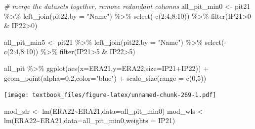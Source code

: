 \documentclass[
  11pt,
]{book}
\newenvironment{Shaded}{\begin{snugshade}}{\end{snugshade}}
\newcommand{\AttributeTok}[1]{\textcolor[rgb]{0.77,0.63,0.00}{#1}}
\newcommand{\CommentTok}[1]{\textcolor[rgb]{0.56,0.35,0.01}{\textit{#1}}}
\newcommand{\DecValTok}[1]{\textcolor[rgb]{0.00,0.00,0.81}{#1}}
\newcommand{\FloatTok}[1]{\textcolor[rgb]{0.00,0.00,0.81}{#1}}
\newcommand{\FunctionTok}[1]{\textcolor[rgb]{0.00,0.00,0.00}{#1}}
\newcommand{\NormalTok}[1]{#1}
\newcommand{\OtherTok}[1]{\textcolor[rgb]{0.56,0.35,0.01}{#1}}
\newcommand{\SpecialCharTok}[1]{\textcolor[rgb]{0.00,0.00,0.00}{#1}}
\newcommand{\StringTok}[1]{\textcolor[rgb]{0.31,0.60,0.02}{#1}}
\theoremstyle{definition}
\theoremstyle{definition}
\theoremstyle{definition}
\theoremstyle{definition}
\theoremstyle{remark}
\begin{document}
\begin{Shaded}
\begin{Highlighting}[]
\CommentTok{\# merge the datasets together, remove redundant columns}
\NormalTok{all\_pit\_min0 }\OtherTok{\textless{}{-}}\NormalTok{ pit21 }\SpecialCharTok{\%\textgreater{}\%} \FunctionTok{left\_join}\NormalTok{(pit22,}\AttributeTok{by =} \StringTok{"Name"}\NormalTok{) }\SpecialCharTok{\%\textgreater{}\%} 
  \FunctionTok{select}\NormalTok{(}\SpecialCharTok{{-}}\FunctionTok{c}\NormalTok{(}\DecValTok{2}\SpecialCharTok{:}\DecValTok{4}\NormalTok{,}\DecValTok{8}\SpecialCharTok{:}\DecValTok{10}\NormalTok{)) }\SpecialCharTok{\%\textgreater{}\%} \FunctionTok{filter}\NormalTok{(IP21}\SpecialCharTok{\textgreater{}}\DecValTok{0} \SpecialCharTok{\&}\NormalTok{ IP22}\SpecialCharTok{\textgreater{}}\DecValTok{0}\NormalTok{)}

\NormalTok{all\_pit\_min5 }\OtherTok{\textless{}{-}}\NormalTok{ pit21 }\SpecialCharTok{\%\textgreater{}\%}  \FunctionTok{left\_join}\NormalTok{(pit22,}\AttributeTok{by =} \StringTok{"Name"}\NormalTok{) }\SpecialCharTok{\%\textgreater{}\%} 
  \FunctionTok{select}\NormalTok{(}\SpecialCharTok{{-}}\FunctionTok{c}\NormalTok{(}\DecValTok{2}\SpecialCharTok{:}\DecValTok{4}\NormalTok{,}\DecValTok{8}\SpecialCharTok{:}\DecValTok{10}\NormalTok{)) }\SpecialCharTok{\%\textgreater{}\%} \FunctionTok{filter}\NormalTok{(IP21}\SpecialCharTok{\textgreater{}}\DecValTok{5} \SpecialCharTok{\&}\NormalTok{ IP22}\SpecialCharTok{\textgreater{}}\DecValTok{5}\NormalTok{)}
\end{Highlighting}
\end{Shaded}

\begin{Shaded}
\begin{Highlighting}[]
\NormalTok{all\_pit }\SpecialCharTok{\%\textgreater{}\%} \FunctionTok{ggplot}\NormalTok{(}\FunctionTok{aes}\NormalTok{(}\AttributeTok{x=}\NormalTok{ERA21,}\AttributeTok{y=}\NormalTok{ERA22,}\AttributeTok{size=}\NormalTok{IP21}\SpecialCharTok{+}\NormalTok{IP22)) }\SpecialCharTok{+} \FunctionTok{geom\_point}\NormalTok{(}\AttributeTok{alpha=}\FloatTok{0.2}\NormalTok{,}\AttributeTok{color=}\StringTok{"blue"}\NormalTok{) }\SpecialCharTok{+}
  \FunctionTok{scale\_size}\NormalTok{(}\AttributeTok{range =} \FunctionTok{c}\NormalTok{(}\DecValTok{0}\NormalTok{,}\DecValTok{5}\NormalTok{))}
\end{Highlighting}
\end{Shaded}

\texttt{[image: textbook\_files/figure-latex/unnamed-chunk-269-1.pdf]}

\newpage

\begin{Shaded}
\begin{Highlighting}[]
\NormalTok{mod\_slr }\OtherTok{\textless{}{-}} \FunctionTok{lm}\NormalTok{(ERA22}\SpecialCharTok{\textasciitilde{}}\NormalTok{ERA21,}\AttributeTok{data=}\NormalTok{all\_pit\_min0)}
\NormalTok{mod\_wls }\OtherTok{\textless{}{-}} \FunctionTok{lm}\NormalTok{(ERA22}\SpecialCharTok{\textasciitilde{}}\NormalTok{ERA21,}\AttributeTok{data=}\NormalTok{all\_pit\_min0,}\AttributeTok{weights =}\NormalTok{ IP21)}
\end{Highlighting}
\end{Shaded}
\end{document}
